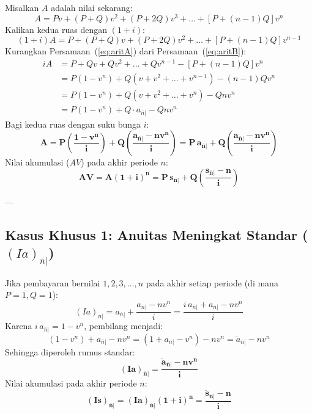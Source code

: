 \documentclass[11pt,a4paper]{article}
\begin{document}
Misalkan $A$ adalah nilai sekarang:
\begin{equation}
    A = P v + (P+Q) v^2 + (P+2Q) v^3 + \dots + [P + (n-1)Q] v^n \label{eq:aritA}
\end{equation}
Kalikan kedua ruas dengan $(1+i)$:
\begin{equation}
    (1+i)A = P + (P+Q) v + (P+2Q) v^2 + \dots + [P + (n-1)Q] v^{n-1} \label{eq:aritB}
\end{equation}
Kurangkan Persamaan~(\ref{eq:aritA}) dari Persamaan~(\ref{eq:aritB}):
\begin{align*}
    i A &= P + Q v + Q v^2 + \dots + Q v^{n-1} - [P + (n-1)Q] v^n \\
        &= P(1 - v^n) + Q(v + v^2 + \dots + v^{n-1}) - (n-1)Q v^n \\
        &= P(1 - v^n) + Q(v + v^2 + \dots + v^n) - Q n v^n \\
        &= P(1 - v^n) + Q \cdot a_{\overline{n}|} - Q n v^n
\end{align*}
Bagi kedua ruas dengan suku bunga $i$:
\begin{equation}
    \mathbf{A = P \left( \frac{1 - v^n}{i} \right) + Q \left( \frac{a_{\overline{n}|} - n v^n}{i} \right) = P \, a_{\overline{n}|} + Q \left( \frac{a_{\overline{n}|} - n v^n}{i} \right)}
\end{equation}
Nilai akumulasi ($AV$) pada akhir periode $n$:
\begin{equation}
    \mathbf{AV = A(1+i)^n = P \, s_{\overline{n}|} + Q \left( \frac{s_{\overline{n}|} - n}{i} \right)}
\end{equation}

---

\subsection{Kasus Khusus 1: Anuitas Meningkat Standar (\texorpdfstring{$(Ia)_{\overline{n}|}$}{(Ia)_n})}

Jika pembayaran bernilai $1, 2, 3, \dots, n$ pada akhir setiap periode (di mana $P = 1, Q = 1$):
\begin{equation}
    (Ia)_{\overline{n}|} = a_{\overline{n}|} + \frac{a_{\overline{n}|} - n v^n}{i} = \frac{i \, a_{\overline{n}|} + a_{\overline{n}|} - n v^n}{i}
\end{equation}
Karena $i \, a_{\overline{n}|} = 1 - v^n$, pembilang menjadi:
\begin{equation*}
    (1 - v^n) + a_{\overline{n}|} - n v^n = (1 + a_{\overline{n}|} - v^n) - n v^n = \ddot{a}_{\overline{n}|} - n v^n
\end{equation*}
Sehingga diperoleh rumus standar:
\begin{equation}
    \mathbf{(Ia)_{\overline{n}|} = \frac{\ddot{a}_{\overline{n}|} - n v^n}{i}}
\end{equation}
Nilai akumulasi pada akhir periode $n$:
\begin{equation}
    \mathbf{(Is)_{\overline{n}|} = (Ia)_{\overline{n}|} (1+i)^n = \frac{\ddot{s}_{\overline{n}|} - n}{i}}
\end{equation}
\end{document}
